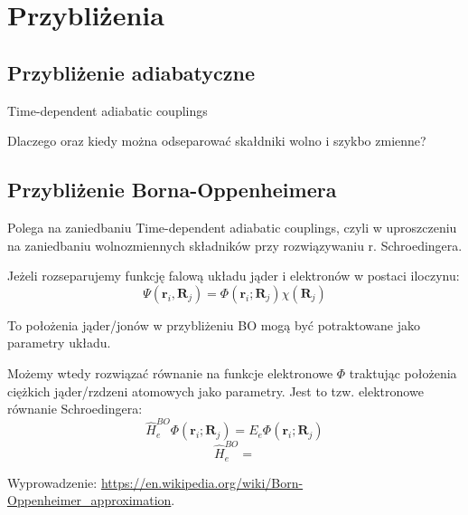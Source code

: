 
\section{Przybliżenia}


\subsection{Przybliżenie adiabatyczne}

Time-dependent adiabatic couplings

Dlaczego oraz kiedy można odseparować skałdniki wolno i szykbo zmienne?


\subsection{Przybliżenie Borna-Oppenheimera}

Polega na zaniedbaniu Time-dependent adiabatic couplings, czyli w
uproszczeniu na zaniedbaniu wolnozmiennych składników przy rozwiązywaniu
r. Schroedingera.

Jeżeli rozseparujemy funkcję falową układu jąder i elektronów w postaci
iloczynu: 
\[
\Psi\left(\boldsymbol{r}_{i},\boldsymbol{R}_{j}\right)=\Phi\left(\boldsymbol{r}_{i};\boldsymbol{R}_{j}\right)\chi\left(\boldsymbol{R}_{j}\right)
\]


To położenia jąder/jonów w przybliżeniu BO mogą być potraktowane jako
parametry układu.

Możemy wtedy rozwiązać równanie na funkcje elektronowe $\Phi$ traktując
położenia ciężkich jąder/rzdzeni atomowych jako parametry. Jest to
tzw. elektronowe równanie Schroedingera:
\[
\hat{H}_{e}^{BO}\Phi\left(\boldsymbol{r}_{i};\boldsymbol{R}_{j}\right)=E_{e}\Phi\left(\boldsymbol{r}_{i};\boldsymbol{R}_{j}\right)
\]
\[
\hat{H}_{e}^{BO}=
\]


Wyprowadzenie: \href{https://en.wikipedia.org/wiki/Born\%E2\%80\%93Oppenheimer_approximation}{https://en.wikipedia.org/wiki/Born-Oppenheimer\_{}approximation}.


